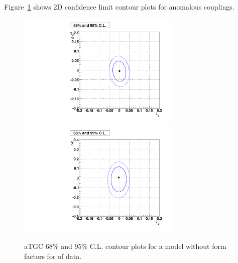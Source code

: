 Figure~\ref{fig:contour} shows 2D confidence limit contour plots for
anomalous couplings.

\begin{figure}[tp]
  \centering
    \includegraphics[width=0.7\textwidth]{figures/lz_dgz_contourplot}
    \includegraphics[width=0.7\textwidth]{figures/lz_dkg_contourplot}
  

  \caption[Contour plots for data] {aTGC 68\% and 95\% C.L. contour
    plots for a model without form factors for \intlumi of data.}
  \label{fig:contour}
\end{figure}

